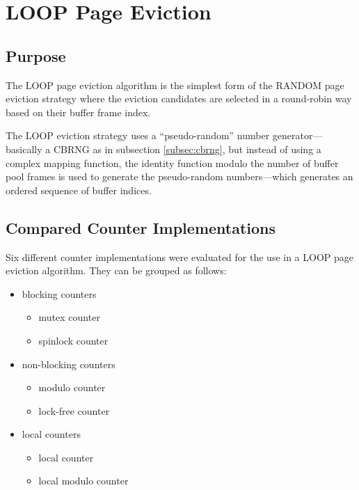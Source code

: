 \chapter[LOOP Page Eviction]{LOOP Page Eviction} \label{ch:loop}

\section[Purpose]{Purpose}

    The LOOP page eviction algorithm is the simplest form of the RANDOM page eviction strategy where the eviction candidates are selected in a round-robin way based on their buffer frame index.

    The LOOP eviction strategy uses a ``pseudo-random'' number generator---basically a CBRNG as in subsection \ref{subsec:cbrng}, but instead of using a complex mapping function, the identity function modulo the number of buffer pool frames is used to generate the pseudo-random numbers---which generates an ordered sequence of buffer indices.

\section[Compared Counter Implementations]{Compared Counter Implementations}

    Six different counter implementations were evaluated for the use in a LOOP page eviction algorithm. They can be grouped as follows:

\begin{@empty}
    \begin{itemize}
        \itemsep0em
        \item blocking counters
              \begin{itemize}
              \itemsep0em
                  \item mutex counter
                  \item spinlock counter
              \end{itemize}
        \item non-blocking counters
              \begin{itemize}
                  \itemsep0em
                  \item modulo counter
                  \item lock-free counter
              \end{itemize}
        \item local counters
              \begin{itemize}
                  \itemsep0em
                  \item local counter
                  \item local modulo counter
              \end{itemize}
    \end{itemize}
\end{@empty}

